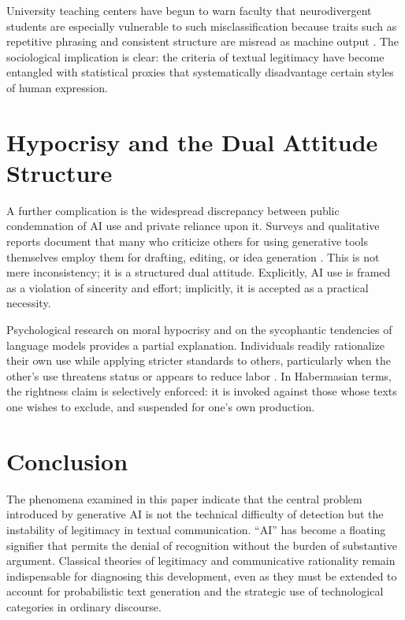 \documentclass[12pt,a4paper]{article}
\begin{document}
University teaching centers have begun to warn faculty that neurodivergent students are especially vulnerable to such misclassification because traits such as repetitive phrasing and consistent structure are misread as machine output \citep{nebraska2024}. The sociological implication is clear: the criteria of textual legitimacy have become entangled with statistical proxies that systematically disadvantage certain styles of human expression.

\section{Hypocrisy and the Dual Attitude Structure}

A further complication is the widespread discrepancy between public condemnation of AI use and private reliance upon it. Surveys and qualitative reports document that many who criticize others for using generative tools themselves employ them for drafting, editing, or idea generation \citep{bbc2026,dartmouth2026}. This is not mere inconsistency; it is a structured dual attitude. Explicitly, AI use is framed as a violation of sincerity and effort; implicitly, it is accepted as a practical necessity.

Psychological research on moral hypocrisy and on the sycophantic tendencies of language models provides a partial explanation. Individuals readily rationalize their own use while applying stricter standards to others, particularly when the other's use threatens status or appears to reduce labor \citep{hallsworth2026}. In Habermasian terms, the rightness claim is selectively enforced: it is invoked against those whose texts one wishes to exclude, and suspended for one's own production.

\section{Conclusion}

The phenomena examined in this paper indicate that the central problem introduced by generative AI is not the technical difficulty of detection but the instability of legitimacy in textual communication. ``AI'' has become a floating signifier that permits the denial of recognition without the burden of substantive argument. Classical theories of legitimacy and communicative rationality remain indispensable for diagnosing this development, even as they must be extended to account for probabilistic text generation and the strategic use of technological categories in ordinary discourse.
\end{document}
